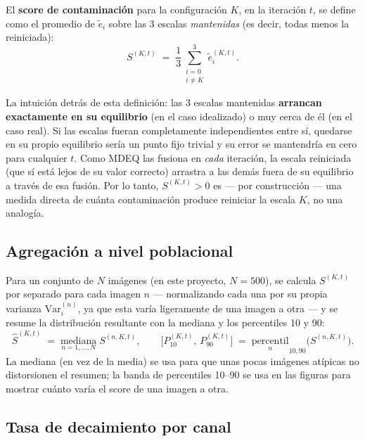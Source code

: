 \documentclass[11pt,a4paper]{article}
\begin{document}
El \textbf{score de contaminación} para la configuración $K$, en la iteración $t$, se define como
el promedio de $\tilde e_i$ sobre las 3 escalas \emph{mantenidas} (es decir, todas menos la
reiniciada):
\begin{equation}
  S^{(K,t)} \;=\; \frac{1}{3} \sum_{\substack{i=0 \\ i \neq K}}^{3} \tilde{e}_i^{(K,t)} .
  \label{eq:score-contaminacion}
\end{equation}

La intuición detrás de esta definición: las 3 escalas mantenidas \textbf{arrancan exactamente en su
equilibrio} (en el caso idealizado) o muy cerca de él (en el caso real). Si las escalas fueran
completamente independientes entre sí, quedarse en su propio equilibrio sería un punto fijo trivial
y su error se mantendría en cero para cualquier $t$. Como MDEQ las fusiona en \emph{cada} iteración,
la escala reiniciada (que sí está lejos de su valor correcto) arrastra a las demás fuera de su
equilibrio a través de esa fusión. Por lo tanto, $S^{(K,t)} > 0$ es --- por construcción --- una
medida directa de cuánta contaminación produce reiniciar la escala $K$, no una analogía.

\subsection{Agregación a nivel poblacional}

Para un conjunto de $N$ imágenes (en este proyecto, $N=500$), se calcula $S^{(K,t)}$ por separado
para cada imagen $n$ --- normalizando cada una por su propia varianza $\mathrm{Var}_i^{(n)}$, ya
que esta varía ligeramente de una imagen a otra --- y se resume la distribución resultante con la
mediana y los percentiles 10 y 90:
\begin{equation}
  \hat{S}^{(K,t)} \;=\; \underset{n=1,\dots,N}{\mathrm{mediana}}\; S^{(n,K,t)}, \qquad
  \Big[P_{10}^{(K,t)},\, P_{90}^{(K,t)}\Big] \;=\;
  \underset{n}{\mathrm{percentil}}_{10,90}\Big(S^{(n,K,t)}\Big).
  \label{eq:agregacion-poblacional}
\end{equation}
La mediana (en vez de la media) se usa para que unas pocas imágenes atípicas no distorsionen el
resumen; la banda de percentiles 10--90 se usa en las figuras para mostrar cuánto varía el score de
una imagen a otra.

\subsection{Tasa de decaimiento por canal}
\label{sec:tasa-decaimiento}
\end{document}
